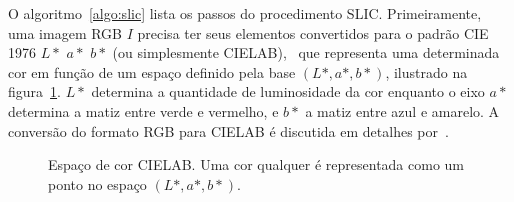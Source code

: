 O algoritmo~\ref{algo:slic} lista os passos do procedimento
SLIC. Primeiramente, uma imagem RGB $I$ precisa ter seus elementos
convertidos para o padrão CIE 1976 $L*$ $a*$ $b*$ (ou simplesmente
CIELAB),~\cite{cielab1} que representa uma determinada cor em função
de um espaço definido pela base $(L*, a*, b*)$, ilustrado na
figura~\ref{fig:cielab}. $L*$ determina a quantidade de luminosidade
da cor enquanto o eixo $a*$ determina a matiz entre verde e vermelho,
e $b*$ a matiz entre azul e amarelo. A conversão do formato RGB para
CIELAB é discutida em detalhes por~\citeauthor{cielab2}.

\begin{figure}[ht!]
\begin{center}
    \caption{Espaço de cor CIELAB. Uma cor qualquer é representada como um ponto
    no espaço $(L*, a*, b*)$.}
  \label{fig:cielab}

  \fonteminha
  \end{center}
\end{figure}

